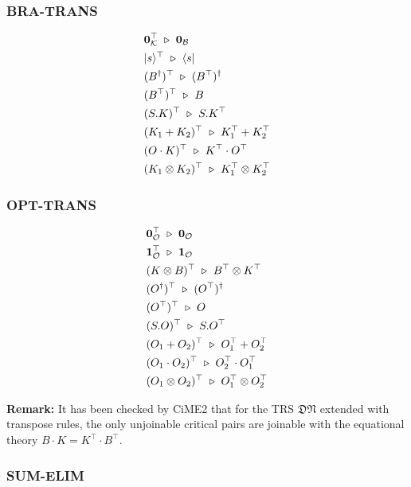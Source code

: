\subsubsection*{\textsf{BRA-TRANS}}
\begin{align*}
  & \mathbf{0}_\mathcal{K}^\top \ \triangleright\  \mathbf{0}_\mathcal{B} \\
  & |s\rangle^\top \ \triangleright\  \langle s| \\
  & (B^\dagger)^\top \ \triangleright\  (B^\top)^\dagger \\
  & (B^\top)^\top \ \triangleright\  B \\
  & (S . K)^\top \ \triangleright\  S . K^\top \\
  & (K_1 + K_2)^\top \ \triangleright\  K_1^\top + K_2^\top \\
  & (O \cdot K)^\top \ \triangleright\  K^\top \cdot O^\top \\
  & (K_1 \otimes K_2)^\top \ \triangleright\  K_1^\top \otimes K_2^\top
\end{align*}


\subsubsection*{\textsf{OPT-TRANS}}
\begin{align*}
  & \mathbf{0}_\mathcal{O}^\top \ \triangleright\  \mathbf{0}_\mathcal{O} \\
  & \mathbf{1}_\mathcal{O}^\top \ \triangleright\  \mathbf{1}_\mathcal{O} \\
  & (K \otimes B)^\top \ \triangleright\  B^\top \otimes K^\top \\
  & (O^\dagger)^\top \ \triangleright\  (O^\top)^\dagger \\
  & (O^\top)^\top \ \triangleright\  O \\
  & (S . O)^\top \ \triangleright\  S . O^\top \\
  & (O_1 + O_2)^\top \ \triangleright\  O_1^\top + O_2^\top \\
  & (O_1 \cdot O_2)^\top \ \triangleright\  O_2^\top \cdot O_1^\top \\
  & (O_1 \otimes O_2)^\top \ \triangleright\  O_1^\top \otimes O_2^\top
\end{align*}

\textbf{Remark:} It has been checked by CiME2 that for the TRS $\mathfrak{DN}$ extended with transpose rules, the only unjoinable critical pairs are joinable with the equational theory $B\cdot K = K^\top \cdot B^\top$.


\subsubsection*{\textsf{SUM-ELIM}}

